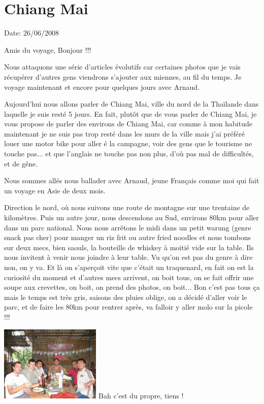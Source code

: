 \section{Chiang Mai}

Date: 26/06/2008

\begin{multicols}{2}

Amis du voyage, Bonjour !!!

Nous attaquons une série d'articles évolutifs car certaines photos que je vais récupérer d'autres gens viendrons s'ajouter aux miennes, au fil du temps. Je voyage maintenant et encore pour quelques jours avec Arnaud.

Aujourd'hui nous allons parler de Chiang Mai, ville du nord de la Thaïlande dans laquelle je suis resté 5 jours. En fait, plutôt que de vous parler de Chiang Mai, je vous propose de parler des environs de Chiang Mai, car comme à mon habitude maintenant je ne suis pas trop resté dans les murs de la ville mais j'ai préféré louer une motor bike pour aller é la campagne, voir des gens que le tourisme ne touche pas... et que l'anglais ne touche pas non plus, d'où pas mal de difficultés, et de gêne.

Nous sommes allés nous ballader avec Arnaud, jeune Français comme moi qui fait un voyage en Asie de deux mois.

Direction le nord, où nous suivons une route de montagne sur une trentaine de kilomètres. Puis un autre jour, nous descendons au Sud, environs 80km pour aller dans un parc national. Nous nous arrêtons le midi dans un petit warung (genre snack pas cher) pour manger un riz frit ou autre fried noodles et nous tombons sur deux mecs, bien saouls, la bouteille de whiskey à moitié vide sur la table. Ils nous invitent à venir nous joindre à leur table. Vu qu'on est pas du genre à dire non, on y va. Et là on s'aperçoit vite que c'était un traquenard, en fait on est la curiosité du moment et d'autres mecs arrivent, on boit tous, on se fait offrir une soupe aux crevettes, on boit, on prend des photos, on boit... Bon c'est pas tous ça mais le temps est très gris, saisons des pluies oblige, on a décidé d'aller voir le parc, et de faire les 80km pour rentrer après, va falloir y aller molo sur la picole !!!

\hspace*{-0.65cm}
\includegraphics[width=4.8cm]{articles/Chiang-mai/1214286196a5oS.jpg}
Bah c'est du propre, tiens !


\end{multicols}

